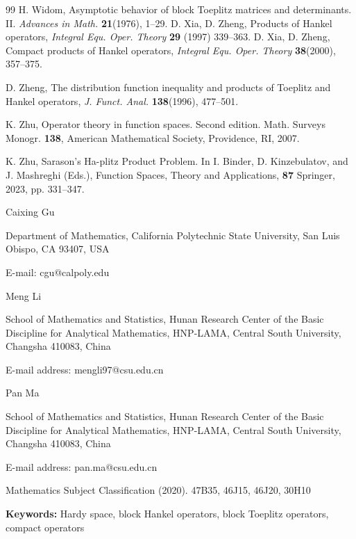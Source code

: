 \documentclass{article}%
\begin{document}
\begin{thebibliography}{99}
H. Widom, Asymptotic behavior of block Toeplitz matrices and determinants. II.
\textsl{Advances in Math.} \textbf{21}(1976), 1--29.
 D. Xia, D. Zheng, Products of Hankel operators, \textsl{Integral Equ. Oper. Theory} \textbf{29} (1997) 339–363.
D. Xia, D. Zheng, Compact products of Hankel operators,
\textsl{Integral Equ. Oper. Theory} \textbf{38}(2000), 357--375.

D. Zheng, The distribution function inequality and products of
Toeplitz and Hankel operators, \textsl{J. Funct. Anal.} \textbf{138}(1996), 477--501.

K. Zhu, Operator theory in function spaces. Second edition.
Math. Surveys Monogr. \textbf{138}, American Mathematical Society, Providence,
RI, 2007.

K. Zhu, Sarason’s Ha-plitz Product Problem. In I. Binder, D. Kinzebulatov, and J. Mashreghi (Eds.), Function Spaces, Theory and Applications, \textbf{87} Springer, 2023, pp. 331--347.
\end{thebibliography}

Caixing Gu

Department of Mathematics, California Polytechnic State University, San Luis
Obispo, CA 93407, USA

E-mail: cgu@calpoly.edu\bigskip\bigskip

Meng Li

School of Mathematics and Statistics, Hunan Research Center of the Basic Discipline for Analytical Mathematics, HNP-LAMA, Central South University, Changsha 410083, China

E-mail address: mengli97@csu.edu.cn\bigskip\bigskip

Pan Ma

School of Mathematics and Statistics, Hunan Research Center of the Basic Discipline for Analytical Mathematics, HNP-LAMA, Central South University, 
Changsha 410083, China


E-mail address: pan.ma@csu.edu.cn

\bigskip

Mathematics Subject Classification (2020). 47B35, 46J15, 46J20, 30H10

\bigskip

\textbf{Keywords:} Hardy space, block Hankel operators, block Toeplitz
operators, compact operators
\end{document}
